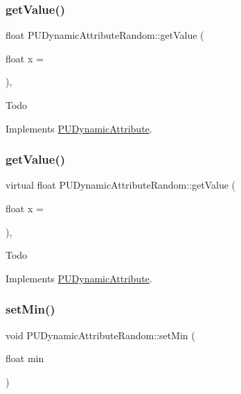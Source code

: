 \subsubsection{\texorpdfstring{get\+Value()}{getValue()}\hspace{0.1cm}{\footnotesize\ttfamily [1/2]}}
{\footnotesize\ttfamily float P\+U\+Dynamic\+Attribute\+Random\+::get\+Value (\begin{DoxyParamCaption}\item[{float}]{x = {} }\end{DoxyParamCaption})\hspace{0.3cm}{\ttfamily [override]}, {\ttfamily [virtual]}}

Todo 

Implements \hyperlink{classPUDynamicAttribute_ac478ecb2528f32b536b1faa72558c756}{P\+U\+Dynamic\+Attribute}.

\mbox{\label{classPUDynamicAttributeRandom_a1b96f087b10c1128f39fb4cc5f25111f}} 
\subsubsection{\texorpdfstring{get\+Value()}{getValue()}\hspace{0.1cm}{\footnotesize\ttfamily [2/2]}}
{\footnotesize\ttfamily virtual float P\+U\+Dynamic\+Attribute\+Random\+::get\+Value (\begin{DoxyParamCaption}\item[{float}]{x = {} }\end{DoxyParamCaption})\hspace{0.3cm}{\ttfamily [override]}, {\ttfamily [virtual]}}

Todo 

Implements \hyperlink{classPUDynamicAttribute_ac478ecb2528f32b536b1faa72558c756}{P\+U\+Dynamic\+Attribute}.

\mbox{\label{classPUDynamicAttributeRandom_a01a86b476cd6053523fccdedc7605519}} 
\subsubsection{\texorpdfstring{set\+Min()}{setMin()}\hspace{0.1cm}{\footnotesize\ttfamily [1/2]}}
{\footnotesize\ttfamily void P\+U\+Dynamic\+Attribute\+Random\+::set\+Min (\begin{DoxyParamCaption}\item[{float}]{min }\end{DoxyParamCaption})}

